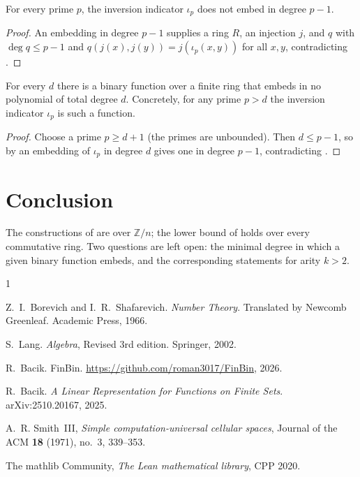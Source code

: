 \begin{theorem}\label{thm:obstruction}
\leanok{}
For every prime $p$, the inversion indicator $\iota_p$ does not embed in degree $p-1$.
\end{theorem}

\begin{proof}\leanok{}
An embedding in degree $p-1$ supplies a ring $R$, an injection $j$, and $q$ with
$\deg q \le p-1$ and $q(j(x),j(y)) = j(\iota_p(x,y))$ for all $x,y$, contradicting
.
\end{proof}

\begin{corollary}\label{cor:arbitrary}
\leanok{}
For every $d$ there is a binary function over a finite ring that embeds in no polynomial of
total degree $d$. Concretely, for any prime $p > d$ the inversion indicator $\iota_p$ is
such a function.
\end{corollary}

\begin{proof}\leanok{}
Choose a prime $p \ge d+1$ (the primes are unbounded). Then $d \le p-1$, so by
 an embedding of $\iota_p$ in degree $d$ gives one in degree $p-1$,
contradicting .
\end{proof}

\section{Conclusion}

The constructions of  are over $\mathbb{Z}/n$; the lower bound
of  holds over every commutative ring. Two questions are left open:
the minimal degree in which a given binary function embeds, and the corresponding statements
for arity $k > 2$.

\begin{thebibliography}{1}

Z.~I.~Borevich and I.~R.~Shafarevich.
\textit{Number Theory}.
Translated by Newcomb Greenleaf.
Academic Press, 1966.

S.~Lang.
\textit{Algebra}, Revised 3rd edition.
Springer, 2002.

R.~Bacik.
FinBin.
\url{https://github.com/roman3017/FinBin}, 2026.

R.~Bacik.
\textit{A Linear Representation for Functions on Finite Sets}.
arXiv:2510.20167, 2025.

 A.~R. Smith~III, \emph{Simple computation-universal cellular spaces},
Journal of the ACM \textbf{18} (1971), no.~3, 339--353.

 The mathlib Community, \emph{The Lean mathematical library}, CPP 2020.

\end{thebibliography}
